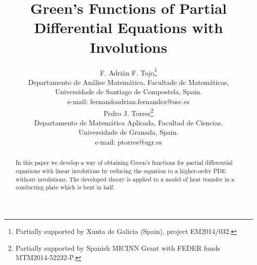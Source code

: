 \documentclass[a4paper,12pt,onecolumn]{article}
\theoremstyle{ptheorem}
\theoremstyle{hdef}
\theoremstyle{premark}
\numberwithin{equation}{section}
\numberwithin{figure}{section}
\newcommand{\<}{\langle}
\renewcommand{\>}{\rangle}
\renewcommand{\<}{\left<}
\renewcommand{\>}{\right>}
\renewcommand{\(}{\left(}
\renewcommand{\)}{\right)}
\begin{document}
\title{Green's Functions of Partial Differential Equations with Involutions}

\author{
F. Adri\'an F. Tojo\footnote{Partially supported by Xunta de Galicia (Spain), project EM2014/032.} \\
\normalsize
Departamento de An\'alise Ma\-te\-m\'a\-ti\-ca, Facultade de Matem\'aticas,\\ 
\normalsize Universidade de Santiago de Com\-pos\-te\-la, Spain.\\ 
\normalsize e-mail: fernandoadrian.fernandez@usc.es\\
Pedro J. Torres\footnote{Partially supported by Spanish MICINN Grant with FEDER funds MTM2014-52232-P.}\\
\normalsize
Departamento de Ma\-te\-m\'a\-ti\-ca Aplicada, Facultad de Ciencias,\\ 
\normalsize Universidade de Granada, Spain.\\ 
\normalsize e-mail: ptorres@ugr.es\\
}
\date{}

\maketitle

\begin{abstract}
In this paper we develop a way of obtaining Green's functions for partial differential equations with linear involutions by reducing the equation to a higher-order PDE without involutions. The developed theory is applied to a model of heat transfer in a conducting plate which is bent in half.
\end{abstract}



\end{document}
